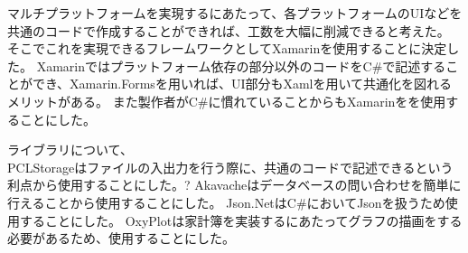 ﻿\documentclass{jsarticle}
\begin{document}
       	マルチプラットフォームを実現するにあたって、各プラットフォームのUIなどを共通のコードで作成することができれば、工数を大幅に削減できると考えた。
        そこでこれを実現できるフレームワークとしてXamarinを使用することに決定した。
        Xamarinではプラットフォーム依存の部分以外のコードをC\#で記述することができ、Xamarin.Formsを用いれば、UI部分もXamlを用いて共通化を図れるメリットがある。
        また製作者がC\#に慣れていることからもXamarinをを使用することにした。
        
        ライブラリについて、\\
        PCLStorageはファイルの入出力を行う際に、共通のコードで記述できるという利点から使用することにした。?
        Akavacheはデータベースの問い合わせを簡単に行えることから使用することにした。
        Json.NetはC\#においてJsonを扱うため使用することにした。
        OxyPlotは家計簿を実装するにあたってグラフの描画をする必要があるため、使用することにした。
\end{document}
